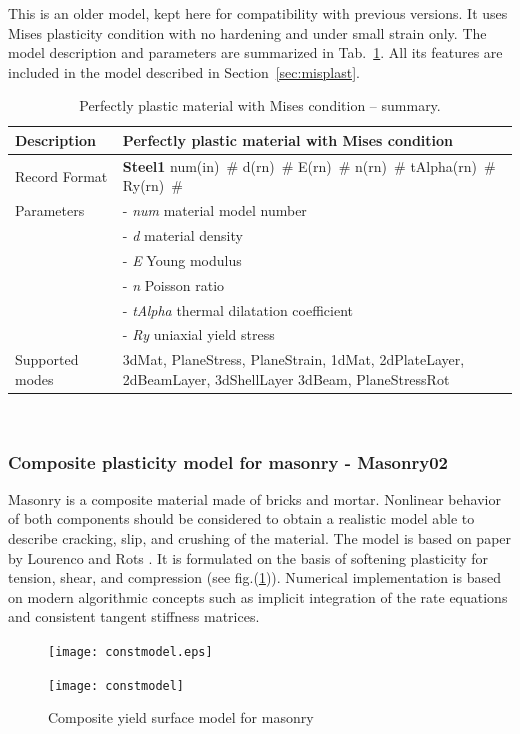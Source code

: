 \documentclass[a4paper]{article}
\newcommand{\descitem}[1]{{\noindent \bf #1}}
\newcommand{\elemparam}[2]{{{#1\tiny (#2)}~\#}}
\newcommand{\param}[1]{{\it #1}}
\newenvironment{mmt}{\begin{tabular}{|l|p{9cm}|}}{\end{tabular}\\}
\newenvironment{mmt}{\begin{tabular}{|l|l|}}{\end{tabular}\\}
\begin{document}
This is an older model, kept here for compatibility with previous versions.
It uses Mises plasticity condition with no hardening and under small strain only.
The model description and parameters are summarized
in Tab.~\ref{Steel1_table}. All its features are included in the model
described in Section~\ref{sec:misplast}. 

\begin{table}[!htb]
\begin{mmt}
\hline
Description & Perfectly plastic material with Mises condition\\
\hline
Record Format & \descitem{Steel1} \elemparam{num}{in}
\elemparam{d}{rn} \elemparam{E}{rn} \elemparam{n}{rn}
\elemparam{tAlpha}{rn} \elemparam{Ry}{rn}\\
Parameters &- \param{num} material model number\\
&- \param{d} material density\\
&- \param{E} Young modulus\\
&- \param{n} Poisson ratio\\
&- \param{tAlpha} thermal dilatation coefficient\\
&- \param{Ry} uniaxial yield stress\\
Supported modes& 3dMat, PlaneStress, PlaneStrain, 1dMat,
2dPlateLayer, 2dBeamLayer, 3dShellLayer
3dBeam, PlaneStressRot\\
\hline
\end{mmt}
\caption{Perfectly plastic material  with Mises condition -- summary.}
\label{Steel1_table}
\end{table}


\subsubsection{Composite plasticity model for masonry - Masonry02}
Masonry is a composite material made of bricks and mortar. Nonlinear behavior of both components should be considered to obtain a realistic model able to describe cracking, slip, and crushing of the material. The model is based on paper by Lourenco and Rots \cite{Rots}. It is formulated on the basis of softening plasticity for tension, shear, and compression (see fig.(\ref{compyieldsurffig})). Numerical implementation is based on modern algorithmic concepts such as implicit integration of the rate equations and consistent tangent stiffness matrices.

\begin{figure}[!htb]
\begin{htmlonly}
  \centerline{\texttt{[image: constmodel.eps]}}
\end{htmlonly}
 \centerline{\texttt{[image: constmodel]}}
  \caption{Composite yield surface model for masonry}
  \label{compyieldsurffig}
\end{figure}
\end{document}

